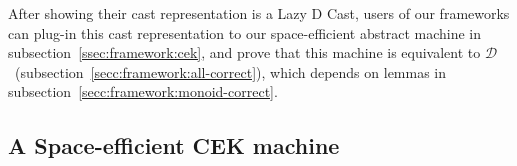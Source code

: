 \documentclass[acmsmall,review,anonymous]{acmart}\settopmatter{printfolios=true,printccs=false,printacmref=false}
\newcommand{\ineffCEKD}{$\mathcal{D}$}
\begin{document}

After showing their cast representation is a Lazy D Cast, users of our 
frameworks can plug-in this cast representation to our space-efficient abstract 
machine in subsection~\ref{ssec:framework:cek}, and prove that this machine is 
equivalent to \ineffCEKD\ (subsection~\ref{secc:framework:all-correct}), which 
depends on lemmas in subsection~\ref{secc:framework:monoid-correct}.

\subsection{A Space-efficient CEK machine}
\label{sec:framework:cek}
\end{document}
